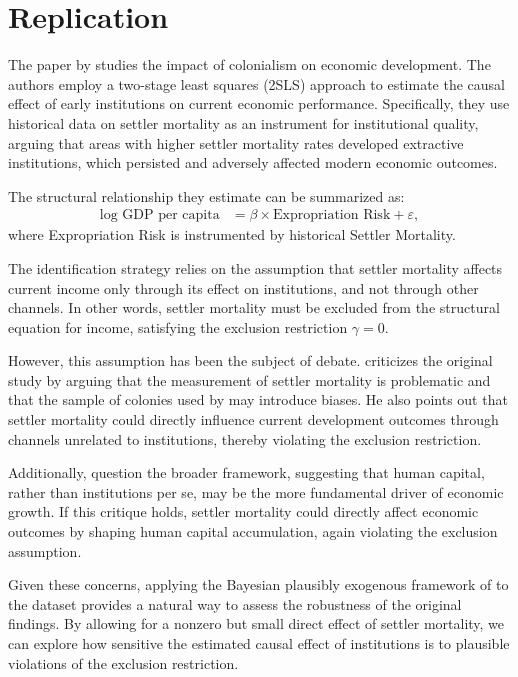 \section{Replication}

The paper by \cite{acemogluColonialOriginsComparative2001} studies the impact of colonialism on economic development. The authors employ a two-stage least squares (2SLS) approach to estimate the causal effect of early institutions on current economic performance. Specifically, they use historical data on settler mortality as an instrument for institutional quality, arguing that areas with higher settler mortality rates developed extractive institutions, which persisted and adversely affected modern economic outcomes. 

The structural relationship they estimate can be summarized as:
\begin{align*}
    \text{log GDP per capita} &= \beta \times \text{Expropriation Risk} + \varepsilon,
\end{align*}
where Expropriation Risk is instrumented by historical Settler Mortality.

The identification strategy relies on the assumption that settler mortality affects current income only through its effect on institutions, and not through other channels. In other words, settler mortality must be excluded from the structural equation for income, satisfying the exclusion restriction $\gamma = 0$.

However, this assumption has been the subject of debate. \cite{albouyColonialOriginsComparative2012} criticizes the original study by arguing that the measurement of settler mortality is problematic and that the sample of colonies used by \cite{acemogluColonialOriginsComparative2001} may introduce biases. He also points out that settler mortality could directly influence current development outcomes through channels unrelated to institutions, thereby violating the exclusion restriction.

Additionally, \cite{glaeserInstitutionsCauseGrowth2004} question the broader framework, suggesting that human capital, rather than institutions per se, may be the more fundamental driver of economic growth. If this critique holds, settler mortality could directly affect economic outcomes by shaping human capital accumulation, again violating the exclusion assumption.

Given these concerns, applying the Bayesian plausibly exogenous framework of \cite{conleyPlausiblyExogenous2012} to the \cite{acemogluColonialOriginsComparative2001} dataset provides a natural way to assess the robustness of the original findings. By allowing for a nonzero but small direct effect of settler mortality, we can explore how sensitive the estimated causal effect of institutions is to plausible violations of the exclusion restriction.

